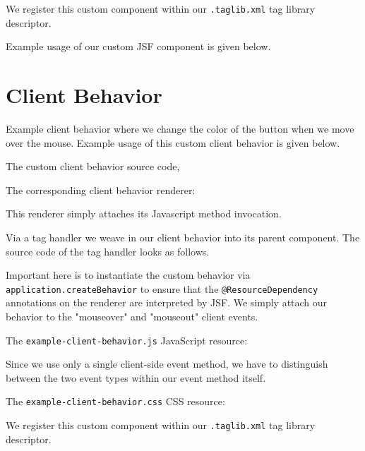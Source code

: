 We register this custom component within our \texttt{.taglib.xml} tag library descriptor.


Example usage of our custom JSF component is given below.


\section{Client Behavior}
Example client behavior where we change the color of the button when we move over the mouse.
Example usage of this custom client behavior is given below.


The custom client behavior source code,


The corresponding client behavior renderer:

This renderer simply attaches its Javascript method invocation.

Via a tag handler we weave in our client behavior into its parent component.
The source code of the tag handler looks as follows.

Important here is to instantiate the custom behavior via \texttt{application.createBehavior} to ensure that the \texttt{@ResourceDependency} annotations on the renderer are interpreted by JSF.
We simply attach our behavior to the "mouseover" and "mouseout" client events.

The \texttt{example-client-behavior.js} JavaScript resource:

Since we use only a single client-side event method, we have to distinguish between the two event types within our event method itself.

The \texttt{example-client-behavior.css} CSS resource:


We register this custom component within our \texttt{.taglib.xml} tag library descriptor.


